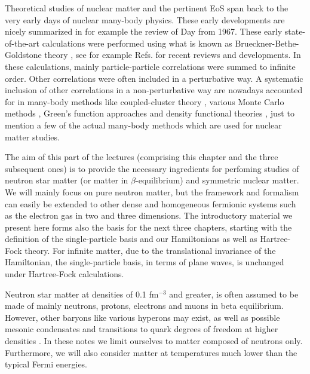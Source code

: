 Theoretical studies of nuclear matter and the pertinent EoS span back
to the very early days of nuclear many-body physics. These early
developments are nicely summarized in for example the review of
Day \cite{day1967} from 1967. These early state-of-the-art
calculations were performed using what is known as
Brueckner-Bethe-Goldstone theory \cite{brueckner1954,brueckner1955}, see for example
Refs.\cite{hh2000,baldo2012,baldo2012a} for recent reviews and developments.  In
these calculations, mainly particle-particle correlations were summed
to infinite order.  Other correlations were often included in a
perturbative way. A systematic inclusion of other correlations in a
non-perturbative way are nowadays accounted for in many-body methods
like coupled-cluster theory \cite{bartlett2007,shavittbartlett2009},
various Monte Carlo methods \cite{gandolfi2009,lovato2012}, Green's
function approaches \cite{baldo2012a,carbone2013,dickhoff2004} and density
functional theories \cite{erler2013}, just to mention a few of the
actual many-body methods which are used for nuclear matter studies.


The aim of this part of the lectures (comprising this chapter and the three subsequent ones) 
is to provide the
necessary ingredients for perfoming studies of neutron star matter (or
matter in $\beta$-equilibrium) and symmetric nuclear matter.  We will
mainly focus on pure neutron matter, but the framework and formalism
can easily be extended to other dense and homogeneous fermionic
systems such as the electron gas in two and three dimensions. The
introductory material we present here forms also the basis for the
next three chapters, starting with the definition of the
single-particle basis and our Hamiltonians as well as Hartree-Fock
theory. For infinite matter, due to the translational invariance of
the Hamiltonian, the single-particle basis, in terms of plane waves,
is unchanged under Hartree-Fock calculations.

Neutron star matter at densities of 0.1 fm$^{-3}$ and greater, is
often assumed to be made of mainly neutrons, protons, electrons and
muons in beta equilibrium. However, other baryons like various
hyperons may exist, as well as possible mesonic condensates and
transitions to quark degrees of freedom at higher densities \cite{hh2000}.  
In these notes we limit ourselves to
matter composed of neutrons only.  Furthermore, we will also
consider matter at temperatures much lower than the typical Fermi
energies.  


